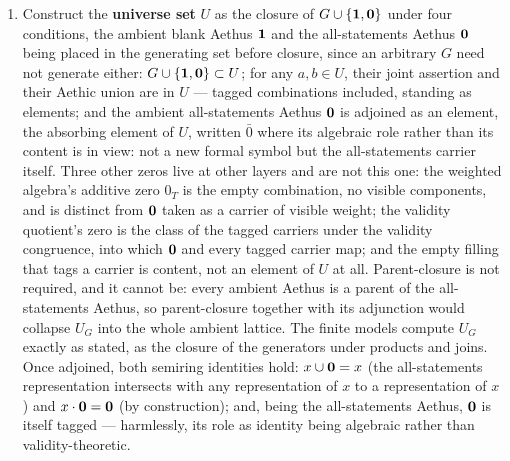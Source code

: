 \begin{defin}
\begin{enumerate}
\item Construct the \textbf{universe set} $U$ as the closure of $G \cup \{\mathbf{1}, \mathbf{0}\}$ under four conditions, the ambient blank Aethus $\mathbf{1}$ and the all-statements Aethus $\mathbf{0}$ being placed in the generating set before closure, since an arbitrary $G$ need not generate either: $G \cup \{\mathbf{1}, \mathbf{0}\} \subset U$; for any $a, b \in U$, their joint assertion and their Aethic union are in $U$ --- tagged combinations included, standing as elements; and the ambient all-statements Aethus $\mathbf{0}$ is adjoined as an element, the absorbing element of $U$, written $\bar 0$ where its algebraic role rather than its content is in view: not a new formal symbol but the all-statements carrier itself. Three other zeros live at other layers and are not this one: the weighted algebra's additive zero $0_T$ is the empty combination, no visible components, and is distinct from $\mathbf{0}$ taken as a carrier of visible weight; the validity quotient's zero is the class of the tagged carriers under the validity congruence, into which $\mathbf{0}$ and every tagged carrier map; and the empty filling that tags a carrier is content, not an element of $U$ at all. Parent-closure is not required, and it cannot be: every ambient Aethus is a parent of the all-statements Aethus, so parent-closure together with its adjunction would collapse $U_G$ into the whole ambient lattice. The finite models compute $U_G$ exactly as stated, as the closure of the generators under products and joins. Once adjoined, both semiring identities hold: $x \cup \mathbf{0} = x$ (the all-statements representation intersects with any representation of $x$ to a representation of $x$) and $x \cdot \mathbf{0} = \mathbf{0}$ (by construction); and, being the all-statements Aethus, $\mathbf{0}$ is itself tagged --- harmlessly, its role as identity being algebraic rather than validity-theoretic.
\end{enumerate}

\end{defin}

